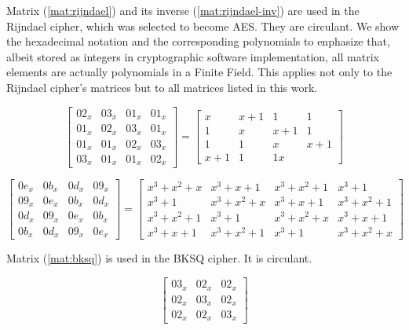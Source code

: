 \documentclass{report}
\begin{document}
\begin{footnotesize}
Matrix (\ref{mat:rijndael}) and its inverse (\ref{mat:rijndael-inv}) are used in the Rijndael \cite{DesignOfRijndael2002} cipher, which was selected to become AES. They are circulant. We show the hexadecimal notation and the corresponding polynomials to enphasize that, albeit stored as integers in cryptographic software implementation, all matrix elements are actually polynomials in a Finite Field. This applies not only to the Rijndael cipher's matrices but to all matrices listed in this work.

\begin{equation}\label{mat:rijndael}
\begin{bmatrix}
02_x & 03_x & 01_x & 01_x\\
01_x & 02_x & 03_x & 01_x\\
01_x & 01_x & 02_x & 03_x\\
03_x & 01_x & 01_x & 02_x
\end{bmatrix}
=
\begin{bmatrix}
x & x+1 & 1 & 1\\
1 & x & x+1 & 1\\
1 & 1 & x & x+1\\
x+1 & 1 & 1 x
\end{bmatrix}
\end{equation}

\begin{equation}\label{mat:rijndael-inv}
\begin{bmatrix}
0e_x & 0b_x & 0d_x & 09_x\\
09_x & 0e_x & 0b_x & 0d_x\\
0d_x & 09_x & 0e_x & 0b_x\\
0b_x & 0d_x & 09_x & 0e_x
\end{bmatrix}
=
\begin{bmatrix}
x^3+x^2+x & x^3+x+1 & x^3+x^2+1 & x^3+1\\
x^3+1 & x^3+x^2+x & x^3+x+1 & x^3+x^2+1\\
x^3+x^2+1 & x^3+1 & x^3+x^2+x & x^3+x+1\\
x^3+x+1 & x^3+x^2+1 & x^3+1 & x^3+x^2+x
\end{bmatrix}
\end{equation}

Matrix (\ref{mat:bksq}) is used in the BKSQ \cite{BKSQ1998} cipher. It is circulant.

\begin{equation}\label{mat:bksq}
\begin{bmatrix}
03_x & 02_x & 02_x\\
02_x & 03_x & 02_x\\
02_x & 02_x & 03_x
\end{bmatrix}
\end{equation}


\end{footnotesize}
\end{document}

